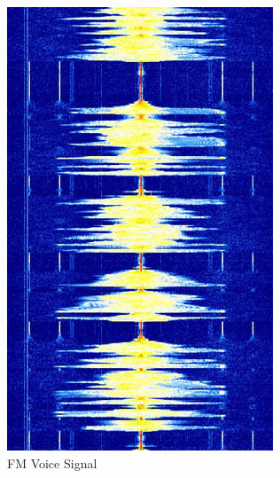 \begin{figure}[h]
\begin{subfigure}[b]{0.2\textwidth}
        \includegraphics[width=\textwidth]{assets/osi/physical/signals/fm_voice.png}
        \caption{FM Voice Signal}
        \label{fig:fm_voice}
    \end{subfigure}
    \hspace{1em}
    \begin{subfigure}[b]{0.2\textwidth}
        \centering

\end{subfigure}
\end{figure}
